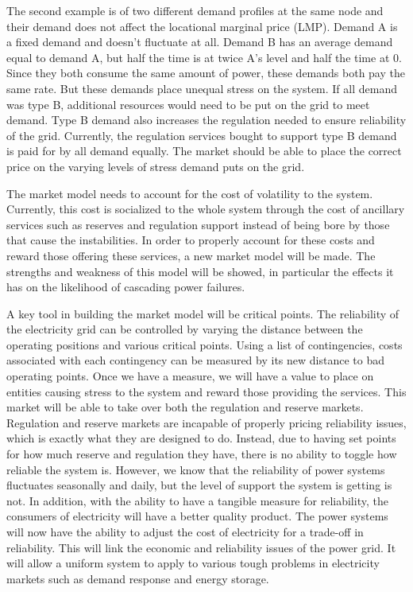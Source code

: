 The second example is of two different demand profiles at the same node and their demand does not affect the locational marginal price (LMP).  Demand A is a fixed demand and doesn't fluctuate at all.  Demand B has an average demand equal to demand A, but half the time is at twice A's level and half the time at 0.  Since they both consume the same amount of power, these demands both pay the same rate.  But these demands place unequal stress on the system.  If all demand was type B, additional resources would need to be put on the grid to meet demand.  Type B demand also increases the regulation needed to ensure reliability of the grid.  Currently, the regulation services bought to support type B demand is paid for by all demand equally.  The market should be able to place the correct price on the varying levels of stress demand puts on the grid.     

The market model needs to account for the cost of volatility to the system.  Currently, this cost is socialized to the whole system through the cost of ancillary services such as reserves and regulation support instead of being bore by those that cause the instabilities.  In order to properly account for these costs and reward those offering these services, a new market model will be made.  The strengths and weakness of this model will be showed, in particular the effects it has on the likelihood of  cascading power failures.

A key tool in building the market model will be critical points. The reliability of the electricity grid can be controlled by varying the distance between the operating positions and various critical points.  Using a list of contingencies, costs associated with each contingency can be measured by its new distance to bad operating points.  Once we have a measure, we will have a value to place on entities causing stress to the system and reward those providing the services.  This market will be able to take over both the regulation and reserve markets.  Regulation and reserve markets are incapable of properly pricing reliability issues, which is exactly what they are designed to do.  Instead, due to having set points for how much reserve and regulation they have, there is no ability to toggle how reliable the system is.  However, we know that the reliability of power systems fluctuates seasonally and daily, but the level of support the system is getting is not.  In addition, with the ability to have a tangible measure for reliability, the consumers of electricity will have a better quality product.  The power systems will now have the ability to adjust the cost of electricity for a trade-off in reliability.  This will link the economic and reliability issues of the power grid.  It will allow a uniform system to apply to various tough problems in electricity markets such as demand response and energy storage.

